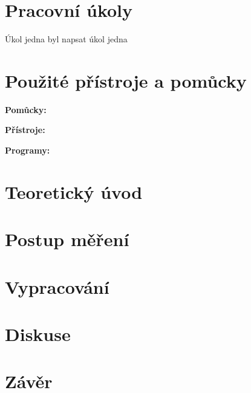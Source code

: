\section{Pracovní úkoly}
\begin{outline}[enumerate]
\1 Úkol jedna byl napsat úkol jedna
\end{outline}


\section{Použité přístroje a pomůcky}
\textbf{Pomůcky:} \par 
\textbf{Přístroje:} \par 
\textbf{Programy:} \par

\section{Teoretický úvod}
	\section{Postup měření}
			
			

					
			
		\section{Vypracování}
					
			
\section{Diskuse}
\section{Závěr}


